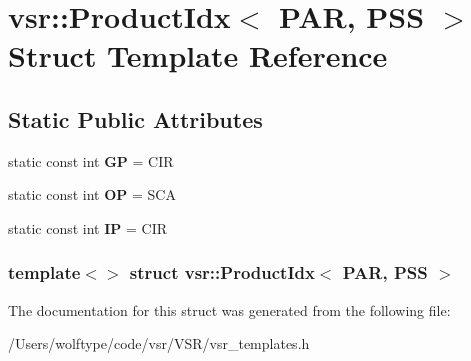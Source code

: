 \hypertarget{structvsr_1_1_product_idx_3_01_p_a_r_00_01_p_s_s_01_4}{\section{vsr\-:\-:Product\-Idx$<$ P\-A\-R, P\-S\-S $>$ Struct Template Reference}
\label{structvsr_1_1_product_idx_3_01_p_a_r_00_01_p_s_s_01_4}
}
\subsection*{Static Public Attributes}
\begin{DoxyCompactItemize}
\item 
\hypertarget{structvsr_1_1_product_idx_3_01_p_a_r_00_01_p_s_s_01_4_aa2656619b921ed2e7d5a83b6487721d9}{static const int {\bfseries G\-P} = C\-I\-R}\label{structvsr_1_1_product_idx_3_01_p_a_r_00_01_p_s_s_01_4_aa2656619b921ed2e7d5a83b6487721d9}

\item 
\hypertarget{structvsr_1_1_product_idx_3_01_p_a_r_00_01_p_s_s_01_4_abf05f55f65385962d7ab73763aee72f6}{static const int {\bfseries O\-P} = S\-C\-A}\label{structvsr_1_1_product_idx_3_01_p_a_r_00_01_p_s_s_01_4_abf05f55f65385962d7ab73763aee72f6}

\item 
\hypertarget{structvsr_1_1_product_idx_3_01_p_a_r_00_01_p_s_s_01_4_a3ab860e161823e10a634d355e9330757}{static const int {\bfseries I\-P} = C\-I\-R}\label{structvsr_1_1_product_idx_3_01_p_a_r_00_01_p_s_s_01_4_a3ab860e161823e10a634d355e9330757}

\end{DoxyCompactItemize}
\subsubsection*{template$<$$>$ struct vsr\-::\-Product\-Idx$<$ P\-A\-R, P\-S\-S $>$}



The documentation for this struct was generated from the following file\-:\begin{DoxyCompactItemize}
\item 
/\-Users/wolftype/code/vsr/\-V\-S\-R/vsr\-\_\-templates.\-h\end{DoxyCompactItemize}
